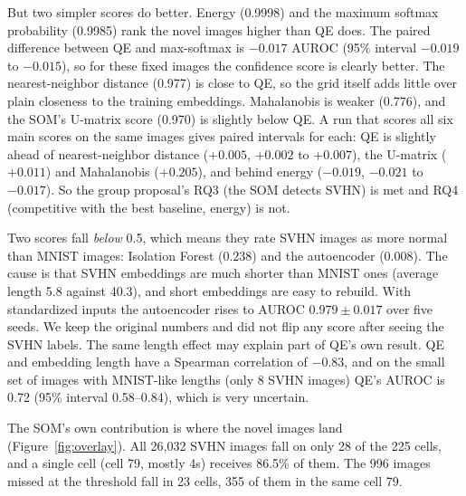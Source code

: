 \documentclass[11pt]{article}
\begin{document}
But two simpler scores do better. Energy (0.9998) and the maximum softmax probability (0.9985) rank the novel images higher than QE does. The paired difference between QE and max-softmax is $-0.017$ AUROC (95\% interval $-0.019$ to $-0.015$), so for these fixed images the confidence score is clearly better.
The nearest-neighbor distance (0.977) is close to QE, so the grid itself adds little over plain closeness to the training embeddings. Mahalanobis is weaker (0.776), and the SOM's U-matrix score (0.970) is slightly below QE. A run that scores all six main scores on the same images gives paired intervals for each: QE is slightly ahead of nearest-neighbor distance ($+0.005$, $+0.002$ to $+0.007$), the U-matrix ($+0.011$) and Mahalanobis ($+0.205$), and behind energy ($-0.019$, $-0.021$ to $-0.017$). So the group proposal's RQ3 (the SOM detects SVHN) is met and RQ4 (competitive with the best baseline, energy) is not.

Two scores fall \emph{below} 0.5, which means they rate SVHN images as more normal than MNIST images: Isolation Forest (0.238) and the autoencoder (0.008). The cause is that SVHN embeddings are much shorter than MNIST ones (average length 5.8 against 40.3), and short embeddings are easy to rebuild.
With standardized inputs the autoencoder rises to AUROC $0.979 \pm 0.017$ over five seeds. We keep the original numbers and did not flip any score after seeing the SVHN labels. The same length effect may explain part of QE's own result. QE and embedding length have a Spearman correlation of $-0.83$, and on the small set of images with MNIST-like lengths (only 8 SVHN images) QE's AUROC is 0.72 (95\% interval 0.58--0.84), which is very uncertain.

The SOM's own contribution is where the novel images land (Figure~\ref{fig:overlay}). All 26,032 SVHN images fall on only 28 of the 225 cells, and a single cell (cell 79, mostly 4s) receives 86.5\% of them. The 996 images missed at the threshold fall in 23 cells, 355 of them in the same cell 79.
\end{document}
